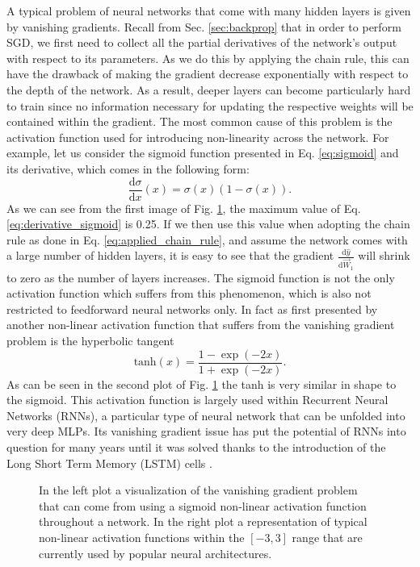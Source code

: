A typical problem of neural networks that come with many hidden layers is given by vanishing gradients. Recall from Sec. \ref{sec:backprop} that in order to perform SGD, we first need to collect all the partial derivatives of the network's output with respect to its parameters. As we do this by applying the chain rule, this can have the drawback of making the gradient decrease exponentially with respect to the depth of the network. As a result, deeper layers can become particularly hard to train since no information necessary for updating the respective weights will be contained within the gradient. The most common cause of this problem is the activation function used for introducing non-linearity across the network. For example, let us consider the sigmoid function presented in Eq. \ref{eq:sigmoid} and its derivative, which comes in the following form:
\begin{equation}
	\frac{\text{d}\sigma}{\text{d}x}(x) = \sigma(x)(1-\sigma(x)).
	\label{eq:derivative_sigmoid}
\end{equation}
As we can see from the first image of Fig. \ref{fig:activation_functions}, the maximum value of Eq. \ref{eq:derivative_sigmoid} is 0.25. If we then use this value when adopting the chain rule as done in Eq. \ref{eq:applied_chain_rule}, and assume the network comes with a large number of hidden layers, it is easy to see that the gradient $\frac{\text{d}\hat{y}}{\text{d}\vec{W}_1}$ will shrink to zero as the number of layers increases. The sigmoid function is not the only activation function which suffers from this phenomenon, which is also not restricted to feedforward neural networks only. In fact as first presented by \citet{hochreiter1997long} another non-linear activation function that suffers from the vanishing gradient problem is the hyperbolic tangent 
\begin{equation}
	\text{tanh}(x) = \frac{1-\exp(-2x)}{1+\exp(-2x)}.
\end{equation}
As can be seen in the second plot of Fig. \ref{fig:activation_functions} the tanh is very similar in shape to the sigmoid. This activation function is largely used within Recurrent Neural Networks (RNNs), a particular type of neural network that can be unfolded into very deep MLPs. Its vanishing gradient issue has put the potential of RNNs into question for many years until it was solved thanks to the introduction of the Long Short Term Memory (LSTM) cells \cite{hochreiter1997long}. 

\begin{figure}[ht!]
	\centering
	
	\caption{In the left plot a visualization of the vanishing gradient problem that can come from using a sigmoid non-linear activation function throughout a network. In the right plot a representation of typical non-linear activation functions within the $[-3,3]$ range that are currently used by popular neural architectures.}
\label{fig:activation_functions}
\end{figure}

